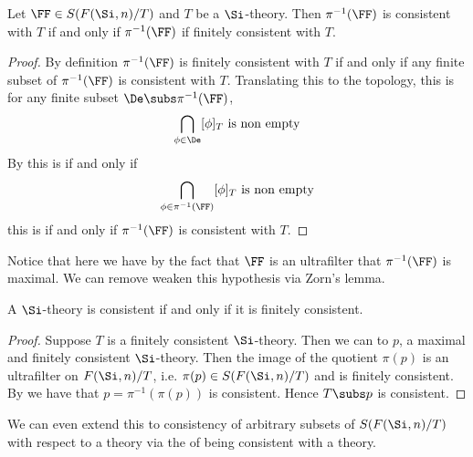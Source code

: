 \begin{prop}
    Let $\FF \in S(F(\Si,n)/T)$ and $T$ be a $\Si$-theory.
    Then $\pi^{-1}(\FF)$ is consistent with $T$ 
    if and only if $\pi^{-1}(\FF)$ if finitely consistent
    with $T$.
\end{prop}
\begin{proof}
    By definition $\pi^{-1}(\FF)$ is finitely consistent with $T$ if and only if 
    any finite subset of $\pi^{-1}(\FF)$ is consistent with $T$.
    Translating this to the topology, this is
    for any finite subset $\De \subs \pi^{-1}(\FF)$,
    \[\bigcap_{\phi \in \De} [\phi]_T \text{ is non empty}\]
    By  
    this is if and only if 
    \[\bigcap_{\phi \in \pi^{-1}(\FF)} [\phi]_T \text{ is non empty}\]
    this is if and only if $\pi^{-1}(\FF)$ is consistent with $T$.
\end{proof}

Notice that here we have by the fact that $\FF$ is an ultrafilter that
$\pi^{-1}(\FF)$ is maximal.
We can remove weaken this hypothesis via Zorn's lemma.

\begin{prop}
    A $\Si$-theory is consistent if and only if it is finitely consistent.
\end{prop}
\begin{proof}
    Suppose $T$ is a finitely consistent $\Si$-theory.
    Then we can  to $p$, 
    a maximal and finitely consistent 
    $\Si$-theory.
    Then the image of the quotient 
    $\pi(p)$ is an ultrafilter on $F(\Si,n) / T$,
    i.e. $\pi(p) \in S(F(\Si,n)/T)$ and
    is finitely consistent.
    By  we have that 
    $p = \pi^{-1}(\pi(p))$ is consistent.
    Hence $T \subs p$ is consistent.
\end{proof}
\begin{rmk}
    We can even extend this to consistency of arbitrary subsets of 
    $S(F(\Si,n) / T)$
    with respect to a theory via the 
    of being consistent with a theory.
\end{rmk}
